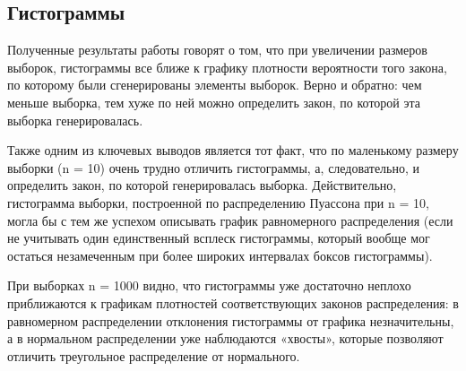 \subsection{Гистограммы}
Полученные результаты работы говорят о том, что при увеличении размеров выборок, гистограммы все ближе к графику плотности вероятности того закона, по которому были сгенерированы элементы выборок. Верно и обратно: чем меньше выборка, тем хуже по ней можно определить закон, по которой эта выборка генерировалась. 

Также одним из ключевых выводов является тот факт, что по
маленькому размеру выборки (n = 10) очень трудно отличить гистограммы, а,
следовательно, и определить закон, по которой генерировалась выборка. Действительно, гистограмма выборки, построенной по распределению Пуассона при n = 10, могла бы с тем же успехом описывать график равномерного распределения (если не учитывать один единственный всплеск гистограммы, который вообще мог остаться незамеченным при более
широких интервалах боксов гистограммы).

При выборках n = 1000 видно, что гистограммы уже достаточно
неплохо приближаются к графикам плотностей соответствующих законов
распределения: в равномерном распределении отклонения гистограммы от
графика незначительны, а в нормальном распределении уже наблюдаются
«хвосты», которые позволяют отличить треугольное распределение от
нормального.